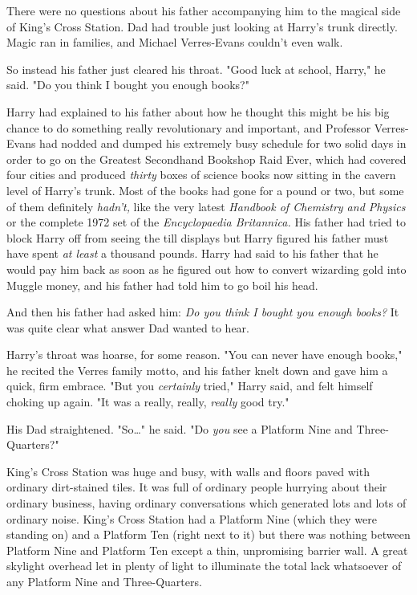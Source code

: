 There were no questions about his father accompanying him to the magical side
of King's Cross Station. Dad had trouble just looking at Harry's trunk
directly. Magic ran in families, and Michael Verres-Evans couldn't even walk.

So instead his father just cleared his throat. "Good luck at school, Harry," he
said. "Do you think I bought you enough books?"

Harry had explained to his father about how he thought this might be his big
chance to do something really revolutionary and important, and Professor
Verres-Evans had nodded and dumped his extremely busy schedule for two solid
days in order to go on the Greatest Secondhand Bookshop Raid Ever, which had
covered four cities and produced \emph{thirty} boxes of science books now
sitting in the cavern level of Harry's trunk. Most of the books had gone for a
pound or two, but some of them definitely \emph{hadn't,} like the very latest
\emph{Handbook of Chemistry and Physics} or the complete 1972 set of the
\emph{Encyclopaedia Britannica.} His father had tried to block Harry off from
seeing the till displays but Harry figured his father must have spent \emph{at
least} a thousand pounds. Harry had said to his father that he would pay him
back as soon as he figured out how to convert wizarding gold into Muggle money,
and his father had told him to go boil his head.

And then his father had asked him: \emph{Do you think I bought you enough
books?} It was quite clear what answer Dad wanted to hear.

Harry's throat was hoarse, for some reason. "You can never have enough books,"
he recited the Verres family motto, and his father knelt down and gave him a
quick, firm embrace. "But you \emph{certainly} tried," Harry said, and felt
himself choking up again. "It was a really, really, \emph{really} good try."

His Dad straightened. "So{\ldots}" he said. "Do \emph{you} see a Platform Nine
and Three-Quarters?"

King's Cross Station was huge and busy, with walls and floors paved with
ordinary dirt-stained tiles. It was full of ordinary people hurrying about
their ordinary business, having ordinary conversations which generated lots and
lots of ordinary noise. King's Cross Station had a Platform Nine (which they
were standing on) and a Platform Ten (right next to it) but there was nothing
between Platform Nine and Platform Ten except a thin, unpromising barrier wall.
A great skylight overhead let in plenty of light to illuminate the total lack
whatsoever of any Platform Nine and Three-Quarters.

